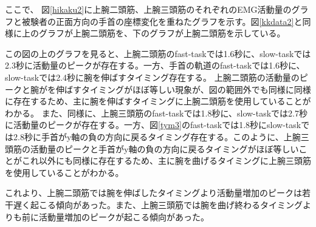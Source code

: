 \documentclass{jsarticle}
\begin{document}
\newpage
ここで、
図\ref{hikaku2}に上腕二頭筋、上腕三頭筋のそれぞれのEMG活動量のグラフと被験者の正面方向の手首の座標変化を重ねたグラフを示す。図\ref{kkdata2}と同様に上のグラフが上腕二頭筋を、下のグラフが上腕二頭筋を示している。


この図の上のグラフを見ると、上腕二頭筋のfast-taskでは1.6秒に、slow-taskでは2.3秒に活動量のピークが存在する。一方、手首の軌道のfast-taskでは1.6秒に、slow-taskでは2.4秒に腕を伸ばすタイミング存在する。
上腕二頭筋の活動量のピークと腕がを伸ばすタイミングがほぼ等しい現象が、図の範囲外でも同様に同様に存在するため、主に腕を伸ばすタイミングに上腕二頭筋を使用していることがわかる。
また、同様に、上腕三頭筋のfast-taskでは1.8秒に、slow-taskでは2.7秒に活動量のピークが存在する。一方、図\ref{tym3}のfast-taskでは1.8秒にslow-taskでは2.8秒に手首がy軸の負の方向に戻るタイミング存在する。このように、上腕三頭筋の活動量のピークと手首がy軸の負の方向に戻るタイミングがほぼ等しいことがこれ以外にも同様に存在するため、主に腕を曲げるタイミングに上腕三頭筋を使用していることがわかる。



これより、上腕二頭筋では腕を伸ばしたタイミングより活動量増加のピークは若干遅く起こる傾向があった。また、上腕三頭筋では腕を曲げ終わるタイミングよりも前に活動量増加のピークが起こる傾向があった。
\end{document}
